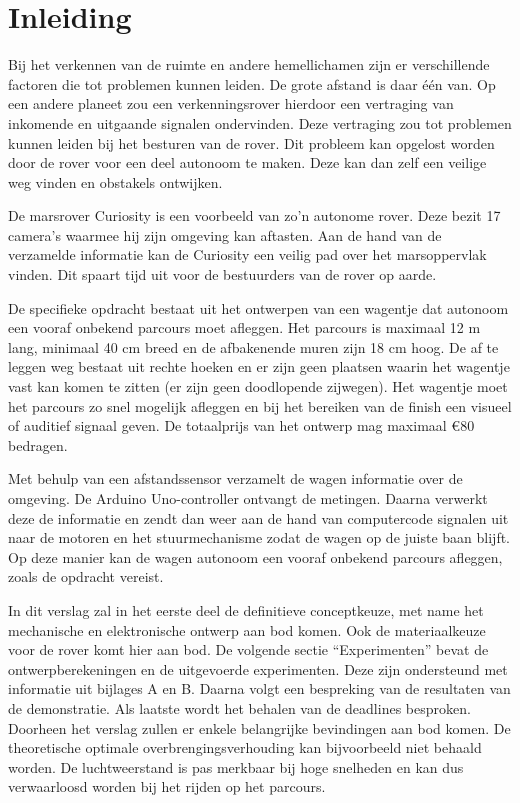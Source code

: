  
\section{Inleiding}
Bij het verkennen van de ruimte en andere hemellichamen zijn er verschillende 
factoren die tot problemen kunnen leiden. De grote afstand is daar één van. Op 
een andere planeet zou een verkenningsrover hierdoor een vertraging van 
inkomende en uitgaande signalen ondervinden. Deze vertraging zou tot problemen 
kunnen leiden bij het besturen van de rover. Dit probleem kan opgelost worden 
door de rover voor een deel autonoom te maken. Deze kan dan zelf een veilige weg 
vinden en obstakels ontwijken.

De marsrover Curiosity is een voorbeeld van zo’n autonome rover. Deze bezit 17 
camera's waarmee hij zijn omgeving kan aftasten. Aan de hand van de verzamelde 
informatie kan de Curiosity een veilig pad over het marsoppervlak vinden. Dit 
spaart tijd uit voor de bestuurders van de rover op aarde.\cite{NASACuriosity, 
NASA2013-259} 

De specifieke opdracht bestaat uit het ontwerpen van een wagentje dat autonoom 
een vooraf onbekend parcours moet afleggen. Het parcours is maximaal 12 m lang, 
minimaal 40 cm breed en de afbakenende muren zijn 18 cm hoog. De af te leggen 
weg bestaat uit rechte hoeken en er zijn geen plaatsen waarin het wagentje vast 
kan komen te zitten (er zijn geen doodlopende zijwegen). Het wagentje moet het 
parcours zo snel mogelijk afleggen en bij het bereiken van de finish een visueel 
of auditief signaal geven. De totaalprijs van het ontwerp mag maximaal \euro 80 
bedragen.

Met behulp van een afstandssensor verzamelt de wagen informatie over de 
omgeving. De Arduino Uno-controller ontvangt de metingen. Daarna verwerkt deze  
de informatie en zendt dan weer aan de hand van computercode signalen uit naar 
de motoren en het stuurmechanisme zodat de wagen op de juiste baan blijft. Op 
deze manier kan de wagen autonoom een vooraf onbekend parcours afleggen, zoals 
de opdracht vereist.

In dit verslag zal in het eerste deel de definitieve conceptkeuze, met name het 
mechanische en elektronische ontwerp aan bod komen. Ook de materiaalkeuze voor 
de rover komt hier aan bod. De volgende sectie “Experimenten” bevat de 
ontwerpberekeningen en de uitgevoerde experimenten. Deze zijn ondersteund met 
informatie uit bijlages A en B. Daarna volgt een bespreking van de resultaten 
van de demonstratie. Als laatste wordt het behalen van de deadlines besproken.
Doorheen het verslag zullen er enkele belangrijke bevindingen aan bod komen. De 
theoretische optimale overbrengingsverhouding kan bijvoorbeeld niet behaald 
worden. De luchtweerstand is pas merkbaar bij hoge snelheden en kan dus 
verwaarloosd worden bij het rijden op het parcours.  
